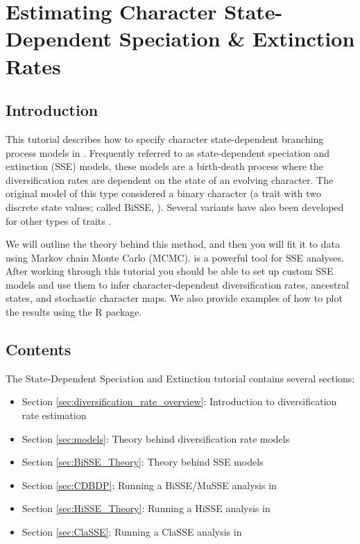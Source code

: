 \section*{Estimating Character State-Dependent Speciation \& Extinction Rates}

\subsection*{Introduction}

This tutorial describes how to specify character state-dependent branching process models in \RevBayes.
Frequently referred to as state-dependent speciation and extinction (SSE) models,
these models are a birth-death process where the diversification rates are dependent on the state of an evolving character.
The original model of this type considered a binary character (a trait with two discrete state values; called BiSSE, \citealt{Maddison2007}).
Several variants have also been developed for other types of traits \citep{FitzJohn2010, Goldberg2011, Goldberg2012, MagnusonFord2012, FitzJohn2012, Beaulieu2016, Freyman2017}.

We will outline the theory behind this method, and then you will fit it to data using Markov chain Monte Carlo (MCMC).
\RevBayes is a powerful tool for SSE analyses. After working through this tutorial you
should be able to set up custom SSE models and use them to
infer character-dependent diversification rates, ancestral states, and stochastic character maps.
We also provide examples of how to plot the results using the \RevGadgets R package.

\subsection*{Contents}

The State-Dependent Speciation and Extinction tutorial contains several sections:

\begin{itemize}
\item Section \ref{sec:diversification_rate_overview}: Introduction to diversification rate estimation
\item Section \ref{sec:models}: Theory behind diversification rate models
\item Section \ref{sec:BiSSE_Theory}: Theory behind SSE models
\item Section \ref{sec:CDBDP}: Running a BiSSE/MuSSE analysis in \RevBayes
\item Section \ref{sec:HiSSE_Theory}: Running a HiSSE analysis in \RevBayes
\item Section \ref{sec:ClaSSE}: Running a ClaSSE analysis in \RevBayes
\end{itemize}

